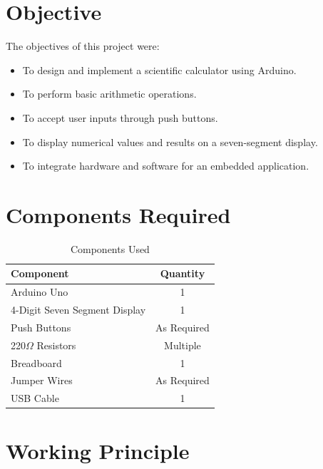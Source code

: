 \documentclass[12pt,a4paper]{report}
\begin{document}

\section{Objective}

The objectives of this project were:

\begin{itemize}
    \item To design and implement a scientific calculator using Arduino.
    \item To perform basic arithmetic operations.
    \item To accept user inputs through push buttons.
    \item To display numerical values and results on a seven-segment display.
    \item To integrate hardware and software for an embedded application.
\end{itemize}


\section{Components Required}

\begin{table}[H]
\centering
\caption{Components Used}

\begin{tabular}{|l|c|}
\hline
Component & Quantity\\
\hline
Arduino Uno & 1\\
4-Digit Seven Segment Display & 1\\
Push Buttons & As Required\\
220$\Omega$ Resistors & Multiple\\
Breadboard & 1\\
Jumper Wires & As Required\\
USB Cable & 1\\
\hline
\end{tabular}

\end{table}


\section{Working Principle}
\end{document}
